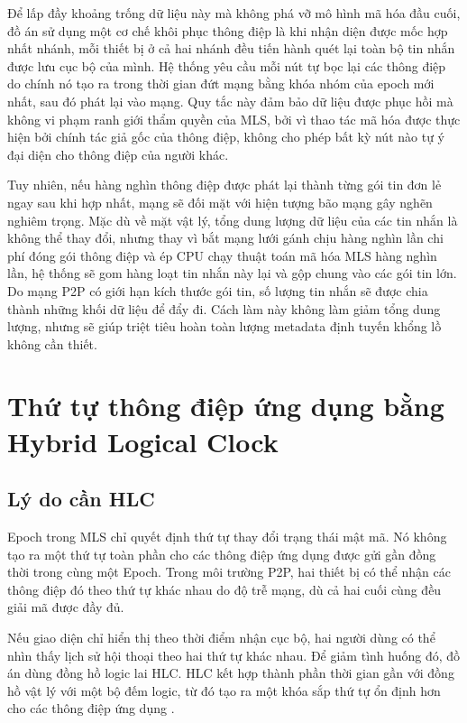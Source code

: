 \documentclass[../DoAn.tex]{subfiles}
\begin{document}
Để lấp đầy khoảng trống dữ liệu này mà không phá vỡ mô hình mã hóa đầu cuối, đồ án sử dụng một cơ chế khôi phục thông điệp là khi nhận diện được mốc hợp nhất nhánh, mỗi thiết bị ở cả hai nhánh đều tiến hành quét lại toàn bộ tin nhắn được lưu cục bộ của mình. Hệ thống yêu cầu mỗi nút tự bọc lại các thông điệp do chính nó tạo ra trong thời gian đứt mạng bằng khóa nhóm của epoch mới nhất, sau đó phát lại vào mạng. Quy tắc này đảm bảo dữ liệu được phục hồi mà không vi phạm ranh giới thẩm quyền của MLS, bởi vì thao tác mã hóa được thực hiện bởi chính tác giả gốc của thông điệp, không cho phép bất kỳ nút nào tự ý đại diện cho thông điệp của người khác.

Tuy nhiên, nếu hàng nghìn thông điệp được phát lại thành từng gói tin đơn lẻ ngay sau khi hợp nhất, mạng sẽ đối mặt với hiện tượng bão mạng gây nghẽn nghiêm trọng. Mặc dù về mặt vật lý, tổng dung lượng dữ liệu của các tin nhắn là không thể thay đổi, nhưng thay vì bắt mạng lưới gánh chịu hàng nghìn lần chi phí đóng gói thông điệp và ép CPU chạy thuật toán mã hóa MLS hàng nghìn lần, hệ thống sẽ gom hàng loạt tin nhắn này lại và gộp chung vào các gói tin lớn. Do mạng P2P có giới hạn kích thước gói tin, số lượng tin nhắn sẽ được chia thành những khối dữ liệu để đẩy đi. Cách làm này không làm giảm tổng dung lượng, nhưng sẽ giúp triệt tiêu hoàn toàn lượng metadata định tuyến khổng lồ không cần thiết.

\section{Thứ tự thông điệp ứng dụng bằng Hybrid Logical Clock}
\label{sec:hlc-ordering}

\subsection{Lý do cần HLC}

Epoch trong MLS chỉ quyết định thứ tự thay đổi trạng thái mật mã. Nó không tạo ra một thứ tự toàn phần cho các thông điệp ứng dụng được gửi gần đồng thời trong cùng một Epoch. Trong môi trường P2P, hai thiết bị có thể nhận các thông điệp đó theo thứ tự khác nhau do độ trễ mạng, dù cả hai cuối cùng đều giải mã được đầy đủ.

Nếu giao diện chỉ hiển thị theo thời điểm nhận cục bộ, hai người dùng có thể nhìn thấy lịch sử hội thoại theo hai thứ tự khác nhau. Để giảm tình huống đó, đồ án dùng đồng hồ logic lai HLC. HLC kết hợp thành phần thời gian gần với đồng hồ vật lý với một bộ đếm logic, từ đó tạo ra một khóa sắp thứ tự ổn định hơn cho các thông điệp ứng dụng \cite{kulkarni2014hlc}.
\end{document}
